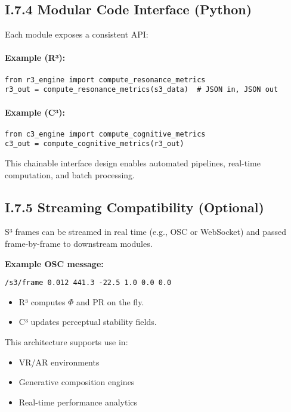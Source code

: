 \subsection*{I.7.4 Modular Code Interface (Python)}

Each module exposes a consistent API:

\paragraph{Example (R³):}
\begin{verbatim}
from r3_engine import compute_resonance_metrics
r3_out = compute_resonance_metrics(s3_data)  # JSON in, JSON out
\end{verbatim}

\paragraph{Example (C³):}
\begin{verbatim}
from c3_engine import compute_cognitive_metrics
c3_out = compute_cognitive_metrics(r3_out)
\end{verbatim}

This chainable interface design enables automated pipelines, real-time computation, and batch processing.

\subsection*{I.7.5 Streaming Compatibility (Optional)}

S³ frames can be streamed in real time (e.g., OSC or WebSocket) and passed frame-by-frame to downstream modules.

\textbf{Example OSC message:}
\begin{verbatim}
/s3/frame 0.012 441.3 -22.5 1.0 0.0 0.0
\end{verbatim}

\begin{itemize}
    \item R³ computes $\Phi$ and PR on the fly.
    \item C³ updates perceptual stability fields.
\end{itemize}

This architecture supports use in:

\begin{itemize}
    \item VR/AR environments
    \item Generative composition engines
    \item Real-time performance analytics
\end{itemize}

